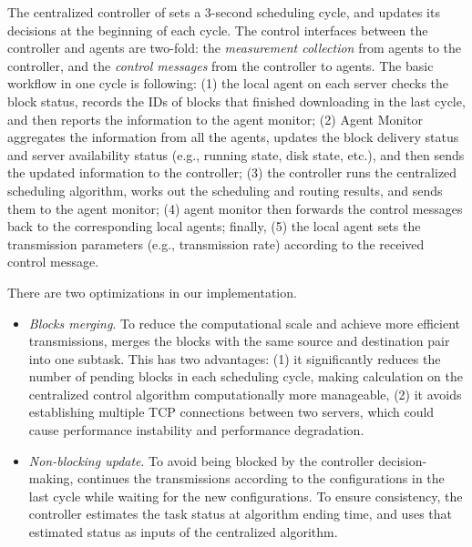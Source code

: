 The centralized controller of \name sets a 3-second scheduling cycle, and updates its decisions at the beginning of each cycle. The control interfaces between the controller and agents are two-fold: the {\em measurement collection} from agents to the controller, and the {\em control messages} from the controller to agents. The basic workflow in one cycle is following: (1) the local agent on each server checks the block status, records the IDs of blocks that finished downloading in the last cycle, and then reports the information to the agent monitor; (2) Agent Monitor aggregates the information from all the agents, updates the block delivery status and server availability status (e.g., running state, disk state, etc.), and then sends the updated information to the controller; (3) the controller runs the centralized scheduling algorithm, works out the scheduling and routing results, and sends them to the agent monitor; (4) agent monitor then forwards the control messages back to the corresponding local agents; finally, (5) the local agent sets the transmission parameters (e.g., transmission rate) according to the received control message.

There are two optimizations in our implementation.
\begin{itemize}
\item \emph{Blocks merging}.
To reduce the computational scale and achieve more efficient transmissions, \name merges the blocks with the same source and destination pair into one subtask.
This has two advantages: (1) it significantly reduces the number of pending blocks in each scheduling cycle, making calculation on the centralized control algorithm computationally more manageable,
(2) it avoids establishing multiple TCP connections between two servers, which could cause performance instability and  performance degradation.
\item \emph{Non-blocking update}. To avoid being blocked by the controller decision-making, \name continues the transmissions according to the configurations in the last cycle while waiting for the new configurations. To ensure consistency, the controller estimates the task status at algorithm ending time, and uses that estimated status as inputs of the centralized algorithm.
\end{itemize}

